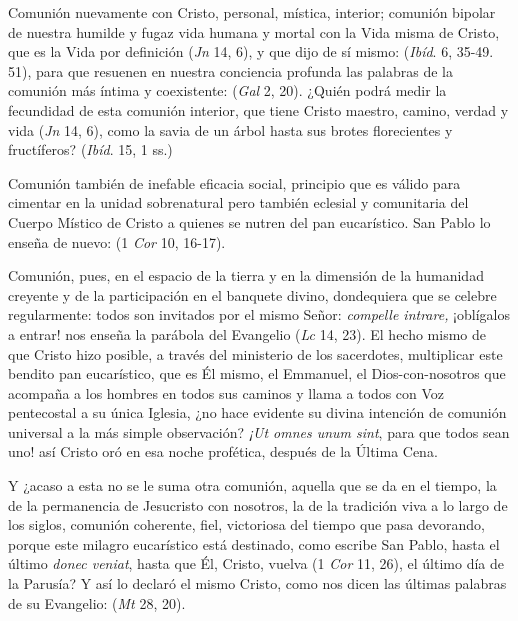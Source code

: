 \begin{body}
Comunión nuevamente con Cristo, personal, mística, interior; comunión bipolar de nuestra humilde y fugaz vida humana y mortal con la Vida misma de Cristo, que es la Vida por definición (\textit{Jn} 14, 6), y que dijo de sí mismo:  (\textit{Ibíd}. 6, 35-49. 51), para que resuenen en nuestra conciencia profunda las palabras de la comunión más íntima y coexistente:  (\textit{Gal} 2, 20). ¿Quién podrá medir la fecundidad de esta comunión interior, que tiene Cristo maestro, camino, verdad y vida (\textit{Jn} 14, 6), como la savia de un árbol hasta sus brotes florecientes y fructíferos? (\textit{Ibíd}. 15, 1 ss.)

Comunión también de inefable eficacia social, principio que es válido para cimentar en la unidad sobrenatural pero también eclesial y comunitaria del Cuerpo Místico de Cristo a quienes se nutren del pan eucarístico. San Pablo lo enseña de nuevo:  (1 \textit{Cor} 10, 16-17). 

Comunión, pues, en el espacio de la tierra y en la dimensión de la humanidad creyente y de la participación en el banquete divino, dondequiera que se celebre regularmente: todos son invitados por el mismo Señor: \textit{compelle intrare,} ¡oblígalos a entrar! nos enseña la parábola del Evangelio (\textit{Lc} 14, 23). El hecho mismo de que Cristo hizo posible, a través del ministerio de los sacerdotes, multiplicar este bendito pan eucarístico, que es Él mismo, el Emmanuel, el Dios-con-nosotros que acompaña a los hombres en todos sus caminos y llama a todos con Voz pentecostal a su única Iglesia, ¿no hace evidente su divina intención de comunión universal a la más simple observación? \textit{¡Ut omnes unum sint}, para que todos sean uno! así Cristo oró en esa noche profética, después de la Última Cena.

Y ¿acaso a esta no se le suma otra comunión, aquella que se da en el tiempo, la de la permanencia de Jesucristo con nosotros, la de la tradición viva a lo largo de los siglos, comunión coherente, fiel, victoriosa del tiempo que pasa devorando, porque este milagro eucarístico está destinado, como escribe San Pablo, hasta el último \textit{donec veniat}, hasta que Él, Cristo, vuelva (1 \textit{Cor} 11, 26), el último día de la Parusía? Y así lo declaró el mismo Cristo, como nos dicen las últimas palabras de su Evangelio:  (\textit{Mt} 28, 20). 


\end{body}
